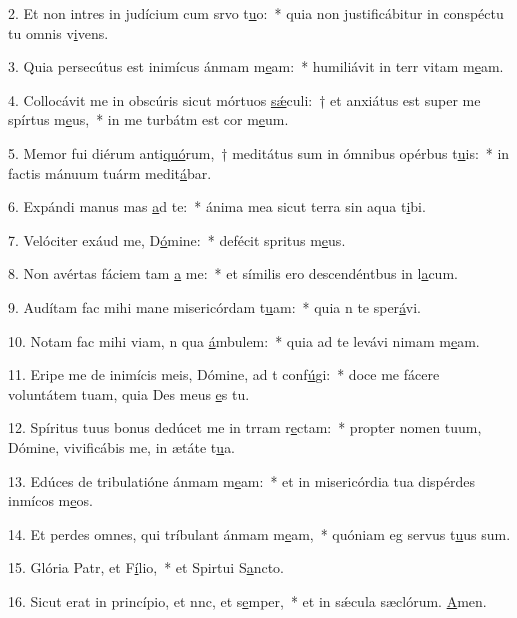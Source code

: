 2. Et non intres in judícium cum srvo t\uline{u}o:~* quia non justificábitur in conspéctu tu omnis v\uline{i}vens.\par 
3. Quia persecútus est inimícus ánmam m\uline{e}am:~* humiliávit in terr vitam m\uline{e}am.\par 
4. Collocávit me in obscúris sicut mórtuos \uline{sǽ}culi:~† et anxiátus est super me spírtus m\uline{e}us,~* in me turbátm est cor m\uline{e}um.\par 
5. Memor fui diérum anti\uline{quó}rum,~† meditátus sum in ómnibus opérbus t\uline{u}is:~* in factis mánuum tuárm medit\uline{á}bar.\par 
6. Expándi manus mas \uline{a}d te:~* ánima mea sicut terra sin aqua t\uline{i}bi.\par 
7. Velóciter exáud me, D\uline{ó}mine:~* defécit spritus m\uline{e}us.\par 
8. Non avértas fáciem tam \uline{a} me:~* et símilis ero descendéntbus in l\uline{a}cum.\par 
9. Audítam fac mihi mane misericórdam t\uline{u}am:~* quia n te sper\uline{á}vi.\par 
10. Notam fac mihi viam, n qua \uline{á}mbulem:~* quia ad te levávi nimam m\uline{e}am.\par 
11. Eripe me de inimícis meis, Dómine, ad t conf\uline{ú}gi:~* doce me fácere voluntátem tuam, quia Des meus \uline{e}s tu.\par 
12. Spíritus tuus bonus dedúcet me in trram r\uline{e}ctam:~* propter nomen tuum, Dómine, vivificábis me, in ætáte t\uline{u}a.\par 
13. Edúces de tribulatióne ánmam m\uline{e}am:~* et in misericórdia tua dispérdes inmícos m\uline{e}os.\par 
14. Et perdes omnes, qui tríbulant ánmam m\uline{e}am,~* quóniam eg servus t\uline{u}us sum.\par 
15. Glória Patr, et F\uline{í}lio,~* et Spirtui S\uline{a}ncto.\par 
16. Sicut erat in princípio, et nnc, et s\uline{e}mper,~* et in sǽcula sæclórum. \uline{A}men.\par 
